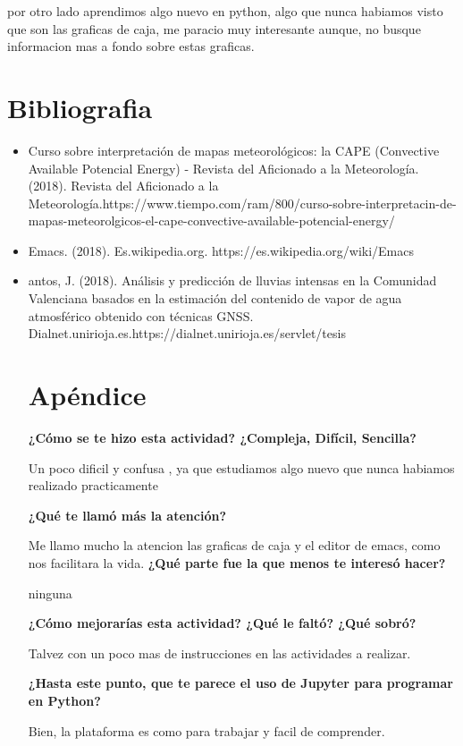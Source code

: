 \documentclass{article}
\begin{document}
por otro lado aprendimos algo nuevo en python, algo que nunca habiamos visto que son las graficas de caja, me paracio muy interesante aunque, no busque informacion mas a fondo sobre estas graficas.



\section{Bibliografia}

\begin{itemize}
\item Curso sobre interpretación de mapas meteorológicos: la CAPE (Convective Available Potencial Energy) - Revista del Aficionado a la Meteorología. (2018). Revista del Aficionado a la Meteorología.https://www.tiempo.com/ram/800/curso-sobre-interpretacin-de-mapas-meteorolgicos-el-cape-convective-available-potencial-energy/

\item
Emacs. (2018). Es.wikipedia.org. https://es.wikipedia.org/wiki/Emacs

\item

antos, J. (2018). Análisis y predicción de lluvias intensas en la Comunidad Valenciana basados en la estimación del contenido de vapor de agua atmosférico obtenido con técnicas GNSS. Dialnet.unirioja.es.https://dialnet.unirioja.es/servlet/tesis



\section{Apéndice}

\textbf{¿Cómo se te hizo esta actividad? ¿Compleja, Difícil, Sencilla?}

Un poco dificil y confusa , ya que estudiamos algo nuevo que nunca habiamos realizado practicamente

\textbf{¿Qué te llamó más la atención?}

Me llamo mucho la atencion las graficas de caja y el editor de emacs, como nos facilitara la vida.
\textbf{¿Qué parte fue la que menos te interesó hacer?}

ninguna


\textbf{¿Cómo mejorarías esta actividad? ¿Qué le faltó? ¿Qué sobró?}

Talvez con un poco mas de instrucciones en las actividades a realizar.

\textbf{¿Hasta este punto, que te parece el uso de Jupyter para programar en Python? 
 }
 
 Bien, la plataforma es como para trabajar y facil de comprender.


\end{itemize}
\end{document}
